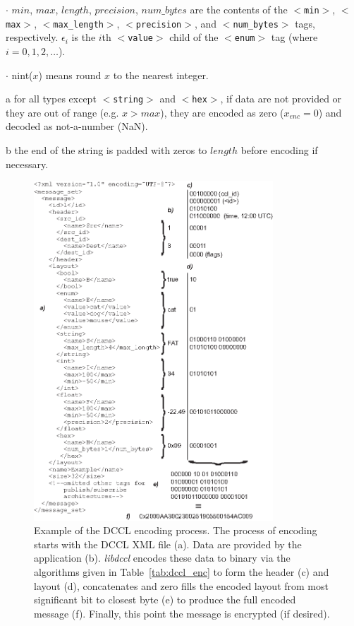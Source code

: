 \documentclass[11pt, letterpaper, oneside]{memoir}
\newcommand{\xmltag}[1]{\texttt{$<$#1$>$}}
\begin{document}
\begin{table}[!t]
\begin{threeparttable}
\begin{tablenotes}
\item $\cdot$ $min$, $max$, $length$, $precision$, $num\_bytes$ are the contents of the \xmltag{min}, \xmltag{max}, \xmltag{max\_length}, \xmltag{precision}, and \xmltag{num\_bytes} tags, respectively. $\epsilon_i$ is the $i$th \xmltag{value} child of the \xmltag{enum} tag (where $i = 0, 1, 2, \ldots$).
\item $\cdot$ nint($x$) means round $x$ to the nearest integer.
\item[a] for all types except \xmltag{string} and \xmltag{hex}, if data are not provided or they are out of range (e.g. $x > max$), they are encoded as zero ($x_{enc} = 0$) and decoded as not-a-number (NaN).
\item[b] the end of the string is padded with zeros to $length$ before encoding if necessary.
\end{tablenotes}
\end{threeparttable}
\end{table}


\begin{figure}
\centering
\includegraphics[width=0.8\textwidth]{dccl_example}
\caption{Example of the DCCL encoding process. The process of encoding starts with the DCCL XML file (a). Data are provided by the application (b). \textit{libdccl} encodes these data to binary via the algorithms given in Table~\ref{tab:dccl_enc} to form the header (c) and layout (d), concatenates and zero fills the encoded layout from most significant bit to closest byte (e) to produce the full encoded message (f). Finally, this point the message is encrypted (if desired). }
\label{fig:dccl_example}
\end{figure}
\end{document}
